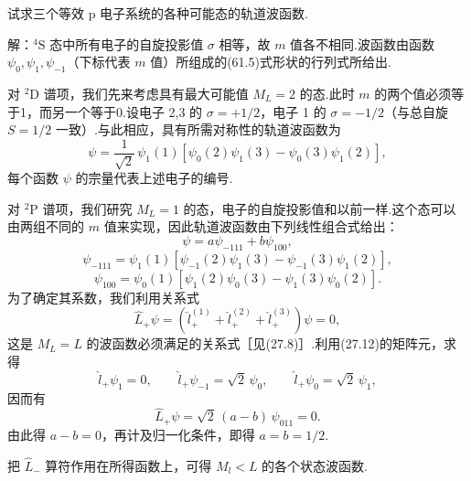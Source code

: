 \begin{xiti}

\quad 试求三个等效 p 电子系统的各种可能态的轨道波函数.

解：${}^{4}\mathrm{S}$ 态中所有电子的自旋投影值 $\sigma$ 相等，故 $m$ 值各不相同.波函数由函数 $\psi_0,\psi_1,\psi_{-1}$（下标代表 $m$ 值）所组成的(61.5)式形状的行列式所给出.

对 ${}^{2}\mathrm{D}$ 谱项，我们先来考虑具有最大可能值 $M_L=2$ 的态.此时 $m$ 的两个值必须等于1，而另一个等于0.设电子 2,3 的 $\sigma=+1/2$，电子 1 的 $\sigma=-1/2$（与总自旋 $S=1/2$ 一致）.与此相应，具有所需对称性的轨道波函数为
\begin{equation*}
  \psi=\frac{1}{\sqrt{2}}\,\psi_1(1)\left[\psi_0(2)\psi_1(3)-\psi_0(3)\psi_1(2)\right],
\end{equation*}
每个函数 $\psi$ 的宗量代表上述电子的编号.

对 ${}^{2}\mathrm{P}$ 谱项，我们研究 $M_L=1$ 的态，电子的自旋投影值和以前一样.这个态可以由两组不同的 $m$ 值来实现，因此轨道波函数由下列线性组合式给出：
\begin{equation*}
  \psi=a\psi_{-111}+b\psi_{100},
\end{equation*}
\begin{equation*}
  \psi_{-111}=\psi_1(1)\left[\psi_{-1}(2)\psi_1(3)-\psi_{-1}(3)\psi_1(2)\right],
\end{equation*}
\begin{equation*}
  \psi_{100}=\psi_0(1)\left[\psi_1(2)\psi_0(3)-\psi_1(3)\psi_0(2)\right].
\end{equation*}
为了确定其系数，我们利用关系式
\begin{equation*}
  \hat{L}_+\psi=\left(\hat{l}_+^{(1)}+\hat{l}_+^{(2)}+\hat{l}_+^{(3)}\right)\psi=0,
\end{equation*}
这是 $M_L=L$ 的波函数必须满足的关系式［见(27.8)］.利用(27.12)的矩阵元，求得
\begin{equation*}
  \hat{l}_+\psi_1=0,\qquad
  \hat{l}_+\psi_{-1}=\sqrt{2}\,\psi_0,\qquad
  \hat{l}_+\psi_0=\sqrt{2}\,\psi_1,
\end{equation*}
因而有
\begin{equation*}
  \hat{L}_+\psi=\sqrt{2}\,(a-b)\,\psi_{011}=0.
\end{equation*}
由此得 $a-b=0$，再计及归一化条件，即得 $a=b=1/2$.

把 $\hat{L}_-$ 算符作用在所得函数上，可得 $M_l<L$ 的各个状态波函数.

\end{xiti}

